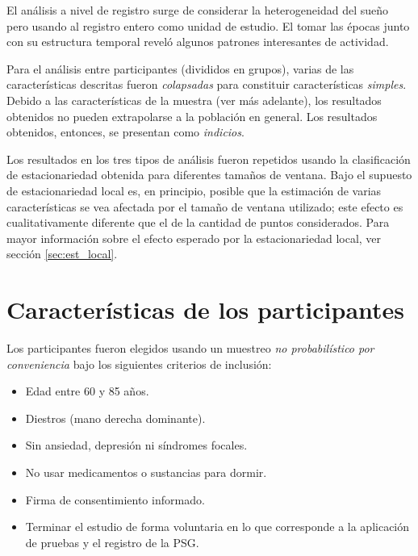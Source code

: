 \documentclass[12pt,letterpaper]{book}
\begin{document}
El análisis a nivel de registro surge de considerar la heterogeneidad del sueño pero usando al registro entero como unidad de estudio.
%
El tomar las épocas junto con su estructura temporal reveló algunos patrones interesantes de actividad.

Para el análisis entre participantes (divididos en grupos), varias de las características descritas fueron \textit{colapsadas} para constituir características \textit{simples}. 
%
Debido a las características de la muestra (ver más adelante), los resultados obtenidos no pueden extrapolarse a la población en general.
%
Los resultados obtenidos, entonces, se presentan como \textit{indicios}.

Los resultados en los tres tipos de análisis fueron repetidos usando la clasificación de estacionariedad obtenida para diferentes tamaños de ventana.
%
Bajo el supuesto de estacionariedad local es, en principio, posible que la estimación de varias características se vea afectada por el tamaño de ventana utilizado; este efecto es cualitativamente diferente que el de la cantidad de puntos considerados.
%
Para mayor información sobre el efecto esperado por la estacionariedad local, ver sección \ref{sec:est_local}.


\section{Características de los participantes}

Los participantes fueron elegidos usando un muestreo \textit{no probabilístico por conveniencia} bajo los siguientes criterios de inclusión:
\begin{itemize}
\item Edad entre 60 y 85 años.
\item Diestros (mano derecha dominante).
\item Sin ansiedad, depresión ni síndromes focales.
\item No usar medicamentos o sustancias para dormir.
\item Firma de consentimiento informado.
\item Terminar el estudio de forma voluntaria en lo que corresponde a la aplicación de pruebas y el registro de la PSG.
\end{itemize}
\end{document}
